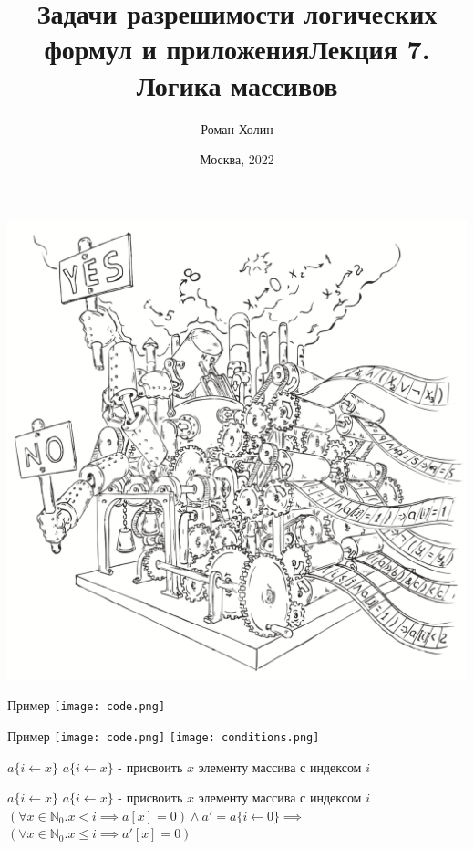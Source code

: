 \documentclass{beamer}
\begin{document}
\title{Задачи разрешимости логических формул и приложения\newline Лекция 7. Логика массивов}
\author{Роман Холин}
\date{Москва, 2022}

\begin{frame}
\includegraphics[scale=0.5]{../decision-procedure.png}
\end{frame}

\frame{\titlepage}

\begin{frame}{Пример}
\texttt{[image: code.png]}
\end{frame}

\begin{frame}{Пример}
\texttt{[image: code.png]}
\texttt{[image: conditions.png]}
\end{frame}

\begin{frame}{$a\{i\leftarrow x\}$}
$a\{i\leftarrow x\}$ - присвоить $x$ элементу массива с индексом $i$\newline
\end{frame}

\begin{frame}{$a\{i\leftarrow x\}$}
$a\{i\leftarrow x\}$ - присвоить $x$ элементу массива с индексом $i$\newline
$(\forall x \in \mathbb{N}_0. x < i \implies a[x] = 0) \wedge a' = a\{i\leftarrow 0\} \implies$\newline
$(\forall x \in \mathbb{N}_0. x \le i \implies a'[x] = 0)$
\end{frame}
\end{document}
